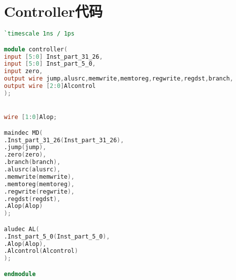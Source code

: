 \section{Controller代码}
\begin{lstlisting}[language=Verilog,frame=single]
`timescale 1ns / 1ps

module controller(
input [5:0] Inst_part_31_26,
input [5:0] Inst_part_5_0,
input zero,
output wire jump,alusrc,memwrite,memtoreg,regwrite,regdst,branch,
output wire [2:0]Alcontrol
);


wire [1:0]Alop;

maindec MD(
.Inst_part_31_26(Inst_part_31_26),
.jump(jump),
.zero(zero),
.branch(branch),
.alusrc(alusrc),
.memwrite(memwrite),
.memtoreg(memtoreg),
.regwrite(regwrite),
.regdst(regdst),
.Alop(Alop)
);

aludec AL(
.Inst_part_5_0(Inst_part_5_0),
.Alop(Alop),
.Alcontrol(Alcontrol)
);

endmodule
\end{lstlisting}
